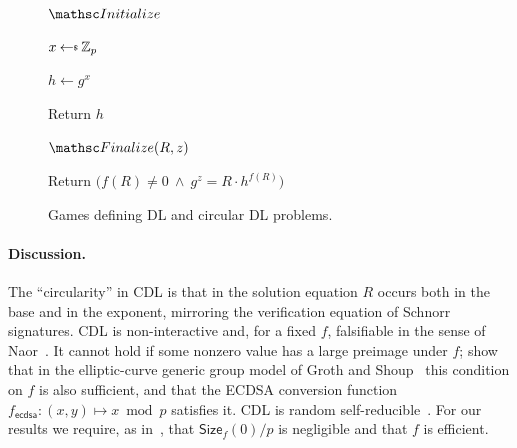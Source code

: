 \begin{figure}[t]
{

\begin{oracle}{$\Initialize$}
\item $x \getsr \Zp$
\item $h \gets g^x$
\item Return $h$
\end{oracle}
\ExptSepSpace
\begin{oracle}{$\Finalize(R, z)$}
\item Return $\big(f(R)\ne 0\:\land\:g^z=R\cdot h^{f(R)}\big)$
\end{oracle}
}
\vspace{-12pt}
	\caption{Games defining DL and circular DL problems.}\label{fig-cdl}
	\vspace{-3pt}\hrulefill
	\vspace{-1ex}
\end{figure}

\paragraph*{Discussion.} The ``circularity'' in CDL is that in the solution equation $R$ occurs both in the base and in the exponent, mirroring the verification equation of Schnorr signatures. CDL is non-interactive and, for a fixed $f$, falsifiable in the sense of Naor~\cite{C:Naor03}. It cannot hold if some nonzero value has a large preimage under $f$; \cite{C:CFOS25} show that in the elliptic-curve generic group model of Groth and Shoup~\cite{EC:GroSho22} this condition on $f$ is also sufficient, and that the ECDSA conversion function $f_{\mathsf{ecdsa}} \colon (x,y) \mapsto x \bmod p$ satisfies it. CDL is random self-reducible~\cite{C:CFOS25}. For our results we require, as in~\cite{C:CFOS25}, that $\mathsf{Size}_f(0)/p$ is negligible and that $f$ is efficient.

